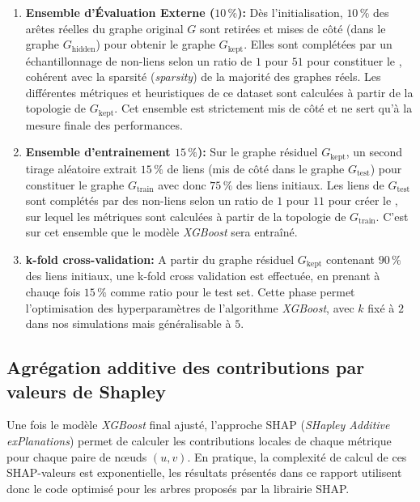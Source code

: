 \begin{enumerate}
    \item \textbf{Ensemble d'Évaluation Externe ($10\,\%$):} Dès l'initialisation, $10\,\%$ des arêtes réelles du graphe original $G$ sont retirées et mises de côté (dans le graphe $G_{\text{hidden}}$) pour obtenir le graphe $G_{\text{kept}}$. Elles sont complétées par un échantillonnage de non-liens selon un ratio de $1$ pour $51$ pour constituer le , cohérent avec la sparsité (\textit{sparsity}) de la majorité des graphes réels. Les différentes métriques et heuristiques de ce dataset sont calculées à partir de la topologie de $G_{\text{kept}}$. Cet ensemble est strictement mis de côté et ne sert qu'à la mesure finale des performances.
    \item \textbf{Ensemble d'entrainement $15\,\%$):} Sur le graphe résiduel $G_{\text{kept}}$, un second tirage aléatoire extrait $15\,\%$ de liens (mis de côté dans le graphe $G_{\text{test}}$) pour constituer le graphe $G_{\text{train}}$ avec donc $75\,\%$ des liens initiaux. Les liens de $G_{\text{test}}$ sont complétés par des non-liens selon un ratio de $1$ pour $11$ pour créer le , sur lequel les métriques sont calculées à partir de la topologie de $G_{\text{train}}$. C'est sur cet ensemble que le modèle \textit{XGBoost} sera entraîné.
    \item \textbf{k-fold cross-validation:} A partir du graphe résiduel $G_{\text{kept}}$ contenant $90\,\%$ des liens initiaux, une k-fold cross validation est effectuée, en prenant à chauqe fois $15\,\%$ comme ratio pour le test set. Cette phase permet l'optimisation des hyperparamètres de l'algorithme \textit{XGBoost}, avec $k$ fixé à $2$ dans nos simulations mais généralisable à $5$.
\end{enumerate}

\subsection{Agrégation additive des contributions par valeurs de Shapley}

Une fois le modèle \textit{XGBoost} final ajusté, l'approche SHAP (\textit{SHapley Additive exPlanations}) permet de calculer les contributions locales de chaque métrique pour chaque paire de nœuds $(u, v)$. En pratique, la complexité de calcul de ces SHAP-valeurs est exponentielle, les résultats présentés dans ce rapport utilisent donc le code optimisé pour les arbres proposés par la librairie SHAP.

